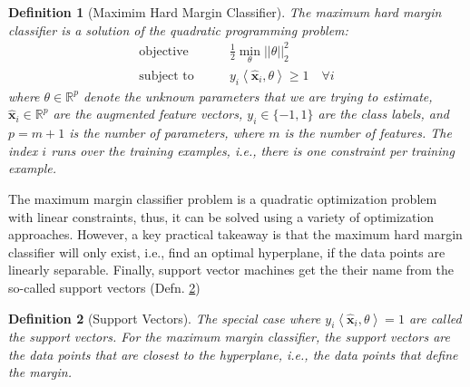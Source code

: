 \documentclass{article}[11pt]
\newtheorem{defn}{Definition}
\def\R{\mathbb{R}}
\newcommand{\norm}[1]{\left|\left|#1\right|\right|}
\begin{document}
\begin{mdframed}
\begin{defn}[Maximim Hard Margin Classifier]\label{defn:max-margin}
The maximum hard margin classifier is a solution of the quadratic programming problem:
\begin{align*}
    \text{objective}\qquad & \frac{1}{2}\min_{\theta}\norm{\theta}_{2}^{2}\\
    \text{subject to}\qquad & y_{i}\left<\hat{\mathbf{x}}_{i},\theta\right> \geq 1\quad\forall i
\end{align*}
where $\theta\in\R^{p}$ denote the unknown parameters that we are trying to estimate,
$\hat{\mathbf{x}}_{i}\in\R^{p}$ are the augmented feature vectors, $y_{i}\in\{-1,1\}$ are the class labels, and $p=m+1$ is the number of parameters, where $m$ is the number of features.
The index $i$ runs over the training examples, i.e., there is one constraint per training example.
\end{defn}
The maximum margin classifier problem is a quadratic optimization problem with linear constraints, thus, it can be solved using a variety of optimization approaches.
However, a key practical takeaway is that the maximum hard margin classifier will only exist, i.e., find an optimal hyperplane, if the data points are linearly separable.
Finally, support vector machines get the their name from the so-called support vectors (Defn. \ref{defn:max-margin-support-vector})
\begin{defn}[Support Vectors]\label{defn:max-margin-support-vector}
The special case where $y_{i}\left<\hat{\mathbf{x}}_{i},\theta\right> = 1$ are called the \textit{support vectors}. 
For the maximum margin classifier, the support vectors are the data points that are closest to the hyperplane, i.e., the data points that define the margin.
\end{defn}
\end{mdframed}
\end{document}
